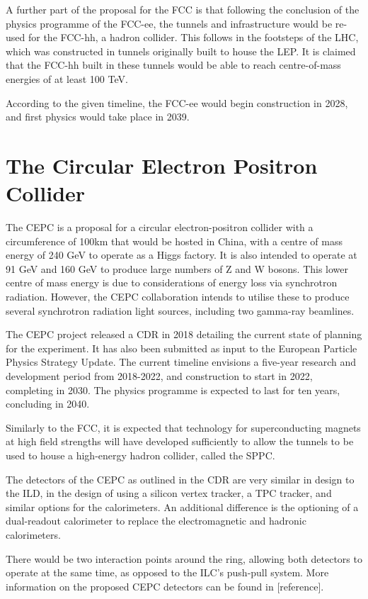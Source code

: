 A further part of the proposal for the \acrshort{FCC} is that following the conclusion of the physics programme of the FCC-ee, the tunnels and infrastructure would be re-used for the FCC-hh, a hadron collider. This follows in the footsteps of the \acrshort{LHC}, which was constructed in tunnels originally built to house the \acrfull{LEP}. It is claimed that the FCC-hh built in these tunnels would be able to reach centre-of-mass energies of at least 100 TeV.

According to the given timeline, the FCC-ee would begin construction in 2028, and first physics would take place in 2039. 


\section{The Circular Electron Positron Collider}
The \acrfull{CEPC} is a proposal for a circular electron-positron collider with a circumference of 100km that would be hosted in China, with a centre of mass energy of 240 GeV to operate as a Higgs factory. It is also intended to operate at 91 GeV and 160 GeV to produce large numbers of Z and W bosons. This lower centre of mass energy is due to considerations of energy loss via synchrotron radiation. However, the \acrshort{CEPC} collaboration intends to utilise these to produce several synchrotron radiation light sources, including two gamma-ray beamlines.

The \acrshort{CEPC} project released a \acrfull{CDR} in 2018 detailing the current state of planning for the experiment. It has also been submitted as input to the European Particle Physics Strategy Update. The current timeline envisions a five-year research and development period from 2018-2022, and construction to start in 2022, completing in 2030. The physics programme is expected to last for ten years, concluding in 2040. 

Similarly to the \acrshort{FCC}, it is expected that technology for superconducting magnets at high field strengths will have developed sufficiently to allow the tunnels to be used to house a high-energy hadron collider, called the \acrfull{SPPC}. 

The detectors of the \acrshort{CEPC} as outlined in the \acrshort{CDR} are very similar in design to the \acrshort{ILD}, in the design of using a silicon vertex tracker, a \acrshort{TPC} tracker, and similar options for the calorimeters. An additional difference is the optioning of a dual-readout calorimeter to replace the electromagnetic and hadronic calorimeters. 

There would be two interaction points around the ring, allowing both detectors to operate at the same time, as opposed to the \acrshort{ILC}'s push-pull system. More information on the proposed \acrshort{CEPC} detectors can be found in [reference].